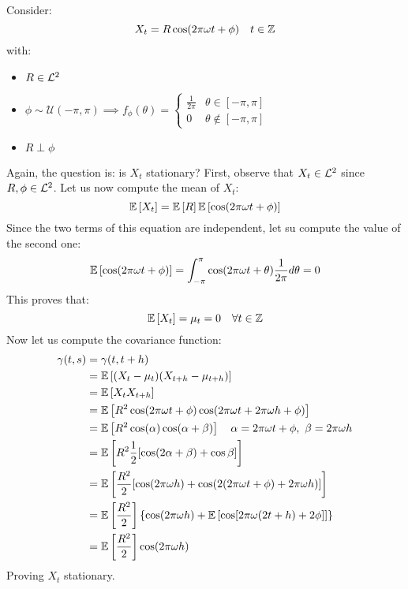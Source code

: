 \begin{example}
    \label{example3}
    Consider:
    \[
        X_t=R\cos(2\pi\omega t+\phi)\ \ \ t\in\mathbb{Z}    
    \]
    with:
    \begin{itemize}
        \item $R\in\mathcal{L}^{2}$
        \item $\phi\sim\mathcal{U}(-\pi,\pi) \implies f_\phi(\theta)=\begin{cases} \frac{1}{2\pi} & \theta\in[-\pi,\pi]\\ 0 & \theta\notin[-\pi,\pi] \end{cases}$
        \item $R\perp\phi$
    \end{itemize}
    Again, the question is: is $X_t$ stationary? First, observe that $X_t\in\mathcal{L}^{2}$ since $R,\phi\in\mathcal{L}^{2}$. Let us now compute the mean of $X_t$:
    \[
        \mathbb{E}\left[X_t\right]=\mathbb{E}\left[R\right]\mathbb{E}\left[\cos(2\pi\omega t+\phi)\right]    
    \]
    Since the two terms of this equation are independent, let su compute the value of the second one:
    \[
        \mathbb{E}\left[\cos(2\pi\omega t+\phi)\right]=\int_{-\pi}^{\pi}\cos(2\pi\omega t+\theta)\frac{1}{2\pi}d\theta=0   
    \]
    This proves that:
    \[
        \mathbb{E}\left[X_t\right]=\mu_t=0\ \ \ \forall t\in\mathbb{Z}  
    \]
    Now let us compute the covariance function:
    \begin{equation*}
        \begin{split}
            \gamma(t,s)&=\gamma(t,t+h)\\
            &=\expect{(X_t-\mu_t)(X_{t+h}-\mu_{t+h})}\\
            &=\expect{X_tX_{t+h}}\\
            &=\expect{R^2\cos(2\pi\omega t+\phi)\cos(2\pi\omega t+2\pi\omega h+\phi)}\\
            &=\expect{R^2\cos(\alpha)\cos(\alpha+\beta)}\ \ \ \alpha=2\pi\omega t+\phi,\ \beta=2\pi\omega h\\
            &=\expect{R^2\frac{1}{2}[\cos(2\alpha+\beta)+\cos\beta]}\\
            &=\expect{\frac{R^2}{2}[\cos(2\pi\omega h)+\cos(2(2\pi\omega t+\phi)+2\pi\omega h)]}\\
            &=\expect{\frac{R^2}{2}}\left\{\cos(2\pi\omega h)+\expect{\cos[2\pi\omega(2t+h)+2\phi]}\right\}\\
            &=\expect{\frac{R^2}{2}}\cos(2\pi\omega h)    
        \end{split} 
    \end{equation*}
    Proving $X_t$ stationary.
\end{example}

